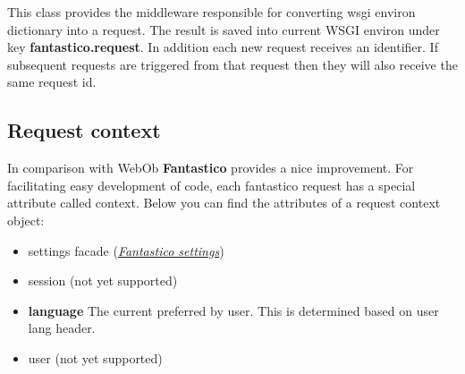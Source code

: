 \documentclass[letterpaper,10pt,english]{sphinxmanual}
\begin{document}
\begin{fulllineitems}
\label{features/request_response:fantastico.middleware.request_middleware.RequestMiddleware}
This class provides the middleware responsible for converting wsgi environ dictionary into a request. The result is saved
into current WSGI environ under key \textbf{fantastico.request}. In addition each new request receives an identifier. If subsequent
requests are triggered from that request then they will also receive the same request id.

\end{fulllineitems}



\subsection{Request context}
\label{features/request_response:request-context}
In comparison with WebOb \textbf{Fantastico} provides a nice improvement. For facilitating easy development of code, each fantastico
request has a special attribute called context. Below you can find the attributes of a request context object:
\begin{itemize}
\item {} 
settings facade ({\hyperref[get_started/settings::doc]{\emph{Fantastico settings}}})

\item {} 
session (not yet supported)

\item {} 
\textbf{language} The current preferred by user. This is determined based on user lang header.

\item {} 
user (not yet supported)

\end{itemize}
\end{document}
